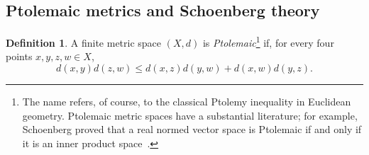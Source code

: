 \documentclass[12pt]{amsart}
\theoremstyle{definition}
\newtheorem{definition}[theorem]{Definition}
\newcommand{\1}{\mathbf{1}}
\begin{document}
\subsection{Ptolemaic metrics and Schoenberg theory}


\begin{definition}
A finite metric space $(X,d)$ is \emph{Ptolemaic}\footnote{The name refers, of course, to the classical Ptolemy inequality in Euclidean geometry. Ptolemaic metric spaces have a substantial literature; for example, Schoenberg proved that a real normed vector space is Ptolemaic if and only if it is an inner product space~\cite{Schoenberg1952Ptolemy}.} if, for every four points
$x,y,z,w\in X$,
\[
        d(x,y)d(z,w)
        \le
        d(x,z)d(y,w)+d(x,w)d(y,z).
\]
\end{definition}
\end{document}
